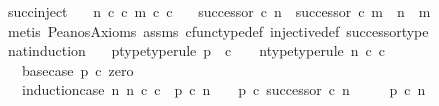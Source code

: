 \begin{isabellebody}
\isamarkupfalse%
\ succ{\isacharunderscore}{\kern0pt}inject{\isacharcolon}{\kern0pt}\isanewline
\ \ \ {\isachardoublequoteopen}n\ {\isasymin}\isactrlsub c\ {\isasymnat}\isactrlsub c{\isachardoublequoteclose}\ {\isachardoublequoteopen}m\ {\isasymin}\isactrlsub c\ {\isasymnat}\isactrlsub c{\isachardoublequoteclose}\isanewline
\ \ \ {\isachardoublequoteopen}successor\ {\isasymcirc}\isactrlsub c\ n\ {\isacharequal}{\kern0pt}\ successor\ {\isasymcirc}\isactrlsub c\ m\ {\isasymLongrightarrow}\ n\ {\isacharequal}{\kern0pt}\ m{\isachardoublequoteclose}\isanewline
%
\isadelimproof
\ \ %
\endisadelimproof
%
\isatagproof
{}\isamarkupfalse%
\ {\isacharparenleft}{\kern0pt}metis\ Peano{\isacharprime}{\kern0pt}s{\isacharunderscore}{\kern0pt}Axioms\ assms\ cfunc{\isacharunderscore}{\kern0pt}type{\isacharunderscore}{\kern0pt}def\ injective{\isacharunderscore}{\kern0pt}def\ successor{\isacharunderscore}{\kern0pt}type{\isacharparenright}{\kern0pt}%
\endisatagproof
{\isafoldproof}%
%
\isadelimproof
\ \isanewline
%
\endisadelimproof
\isanewline
{}\isamarkupfalse%
\ nat{\isacharunderscore}{\kern0pt}induction{\isacharcolon}{\kern0pt}\isanewline
\ \ \ p{\isacharunderscore}{\kern0pt}type{\isacharbrackleft}{\kern0pt}type{\isacharunderscore}{\kern0pt}rule{\isacharbrackright}{\kern0pt}{\isacharcolon}{\kern0pt}\ {\isachardoublequoteopen}p\ {\isacharcolon}{\kern0pt}\ {\isasymnat}\isactrlsub c\ {\isasymrightarrow}\ {\isasymOmega}{\isachardoublequoteclose}\ \ n{\isacharunderscore}{\kern0pt}type{\isacharbrackleft}{\kern0pt}type{\isacharunderscore}{\kern0pt}rule{\isacharbrackright}{\kern0pt}{\isacharcolon}{\kern0pt}\ {\isachardoublequoteopen}n\ {\isasymin}\isactrlsub c\ {\isasymnat}\isactrlsub c{\isachardoublequoteclose}\isanewline
\ \ \ base{\isacharunderscore}{\kern0pt}case{\isacharcolon}{\kern0pt}\ {\isachardoublequoteopen}p\ {\isasymcirc}\isactrlsub c\ zero\ {\isacharequal}{\kern0pt}\ {\isasymt}{\isachardoublequoteclose}\isanewline
\ \ \ induction{\isacharunderscore}{\kern0pt}case{\isacharcolon}{\kern0pt}\ {\isachardoublequoteopen}{\isasymAnd}n{\isachardot}{\kern0pt}\ n\ {\isasymin}\isactrlsub c\ {\isasymnat}\isactrlsub c\ {\isasymLongrightarrow}\ p\ {\isasymcirc}\isactrlsub c\ n\ {\isacharequal}{\kern0pt}\ {\isasymt}\ {\isasymLongrightarrow}\ p\ {\isasymcirc}\isactrlsub c\ successor\ {\isasymcirc}\isactrlsub c\ n\ {\isacharequal}{\kern0pt}\ {\isasymt}{\isachardoublequoteclose}\isanewline
\ \ \ {\isachardoublequoteopen}p\ {\isasymcirc}\isactrlsub c\ n\ {\isacharequal}{\kern0pt}\ {\isasymt}{\isachardoublequoteclose}\isanewline

\end{isabellebody}
